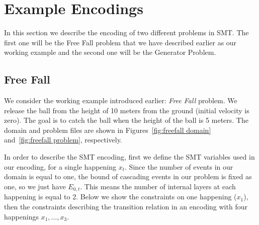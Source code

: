 \section{Example Encodings}\label{sec:example_encodings}

In this section we describe the encoding of two different problems in SMT. The first one will be the Free Fall problem that we have described earlier as our working example and the second one will be the Generator Problem. 

\subsection{Free Fall} \label{sssec:Free_Fall}

We consider the working example introduced earlier: \emph{Free Fall} problem. We release the ball from the height of 10 meters from the ground (initial velocity is zero). The goal is to catch the ball when the height of the ball is 5 meters. The domain and problem files are shown in Figures~\ref{fig:freefall domain} and~\ref{fig:freefall problem}, respectively.

In order to describe the SMT encoding, first we define the SMT variables used in our encoding, for a single happening $x_t$. Since the number of events in our domain is equal to one, the bound of cascading events in our problem is fixed as one, so we just have $E_{0,t}$. This means the number of internal layers at each happening is equal to 2. Below we show the constraints on one happening ($x_1$), then the constraints describing the transition relation in an encoding with four happenings $x_{1}, \ldots, x_3$.

